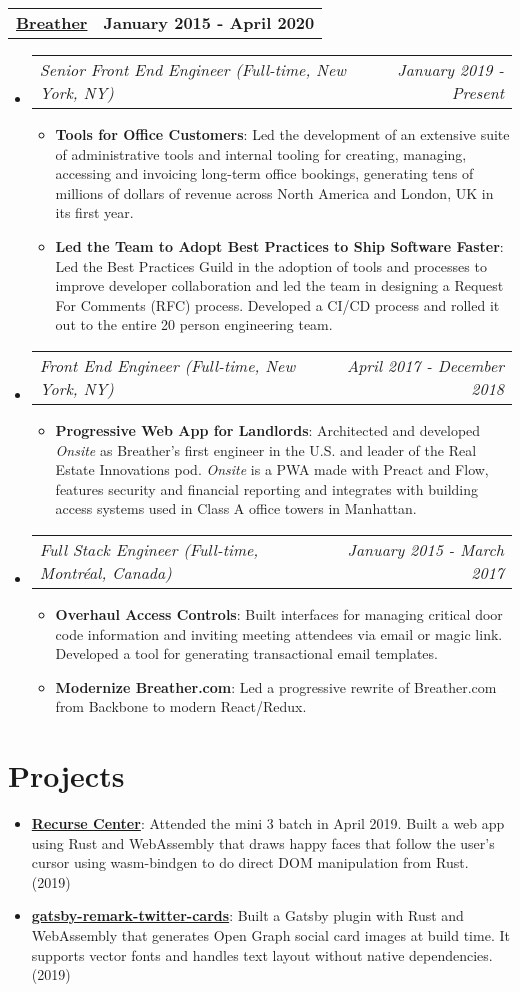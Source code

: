 \documentclass[letterpaper,10.8pt]{article}
\makeatletter
\newcommand{\resumeItem}[2]{
  \item\small{
    \textbf{#1}{: #2 \vspace{-2pt}}
  }
}
\newcommand{\jobLineItem}[2]{
  \vspace{0pt}\item[]
    \begin{tabular*}{0.98\textwidth}{l@{\extracolsep{\fill}}r}
      \textit{#1} & \textit{\small #2} \\
    \end{tabular*}\vspace{-4pt}
}
\newcommand{\employerTitle}[3]{
  \begin{tabular*}{1\textwidth}{l@{\extracolsep{\fill}}r}
    \href{#1}{\textbf{#2}} & \textbf{#3} \\
  \end{tabular*}\vspace{-4pt}
}
\newcommand{\resumeSubItem}[2]{\resumeItem{#1}{#2}\vspace{-5pt}}
\newcommand{\resumeSubHeadingListStart}{\begin{itemize}[leftmargin=*]}
\newcommand{\resumeSubHeadingListEnd}{\end{itemize}}
\newcommand{\resumeItemListStart}{\begin{itemize}}
\newcommand{\resumeItemListEnd}{\end{itemize}\vspace{-5pt}}
\makeatother
\begin{document}
  \employerTitle
    {https://breather.com}{Breather}{January 2015 - April 2020}
  \resumeSubHeadingListStart
    \jobLineItem
        {Senior Front End Engineer (Full-time, New York, NY)}{January 2019 - Present}
    \resumeItemListStart
        \resumeItem{Tools for Office Customers}
        {Led the development of an extensive suite of administrative tools and internal tooling for creating, managing, accessing and invoicing long-term office bookings, generating tens of millions of dollars of revenue across North America and London, UK in its first year.}
        \resumeItem{Led the Team to Adopt Best Practices to Ship Software Faster}
        {Led the Best Practices Guild in the adoption of tools and processes to improve developer collaboration and led the team in designing a Request For Comments (RFC) process. Developed a CI/CD process and rolled it out to the entire 20 person engineering team.}
    \resumeItemListEnd
    \jobLineItem
        {Front End Engineer (Full-time, New York, NY)}{April 2017 - December 2018}
    \resumeItemListStart
        \resumeItem{Progressive Web App for Landlords}
        {Architected and developed \textit{Onsite} as Breather’s first engineer in the U.S. and leader of the Real Estate Innovations pod. \textit{Onsite} is a PWA made with Preact and Flow, features security and financial reporting and integrates with building access systems used in Class A office towers in Manhattan.}
      \resumeItemListEnd
    \jobLineItem
		    {Full Stack Engineer (Full-time, Montréal, Canada)}{January 2015 - March 2017}
		\resumeItemListStart
        \resumeItem{Overhaul Access Controls}
        {Built interfaces for managing critical door code information and inviting meeting attendees via email or magic link. Developed a tool for generating transactional email templates.}
        \resumeItem{Modernize Breather.com}
        {Led a progressive rewrite of Breather.com from Backbone to modern React/Redux.}
    \resumeItemListEnd
    \resumeSubHeadingListEnd

\section{Projects}
\resumeSubHeadingListStart
\resumeSubItem{\href{https://github.com/alessbell/lines}{Recurse Center}}{Attended the mini 3 batch in April 2019. Built a web app using Rust and WebAssembly that draws happy faces that follow the user's cursor using wasm-bindgen to do direct DOM manipulation from Rust. (2019)}
\resumeSubItem{\href{https://aless.co/gatsby-wasm-plugin/}{gatsby-remark-twitter-cards}}{Built a Gatsby plugin with Rust and WebAssembly that generates Open Graph social card images at build time. It supports vector fonts and handles text layout without native dependencies. (2019)}
\vspace{5px}
\resumeSubHeadingListEnd
\end{document}

